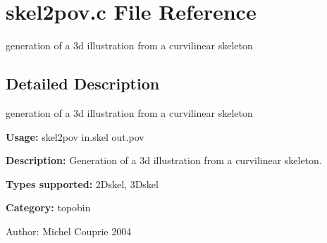 \section{skel2pov.c File Reference}
\label{skel2pov_8c}
generation of a 3d illustration from a curvilinear skeleton 



\subsection{Detailed Description}
generation of a 3d illustration from a curvilinear skeleton 

{\bf Usage:} skel2pov in.skel out.pov

{\bf Description:} Generation of a 3d illustration from a curvilinear skeleton.

{\bf Types supported:} 2Dskel, 3Dskel

{\bf Category:} topobin

\begin{Desc}
\item[Author:]Michel Couprie 2004 \end{Desc}
